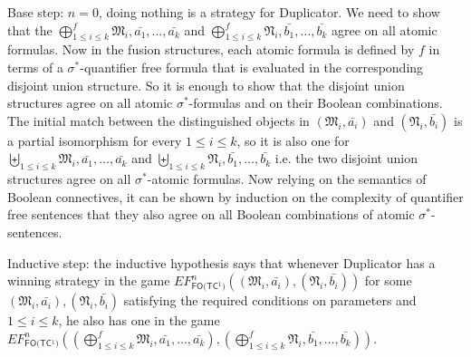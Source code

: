 \documentclass{LMCS}
\newcommand{\frM}{\mathfrak{M}}
\newcommand{\frN}{\mathfrak{N}}
\newcommand{\fotc}{\textsf{FO(TC$^1$)}\xspace}
\begin{document}
Base step: $n=0$, doing nothing is a strategy for Duplicator. We
need to show that the $\bigoplus_{ 1 \leq i \leq k}^f
\frM_i, \bar{a_1},\ldots,\bar{a_k}$ and $\bigoplus_{ 1
\leq i \leq k}^f \frN_i, \bar{b_1},\ldots,\bar{b_k}$ agree on all
atomic formulas. Now in the fusion structures, each atomic formula is
defined by $f$ in terms of a $\sigma^*$-quantifier free formula
that is evaluated in the corresponding disjoint union structure. So it
is enough to show that the disjoint union structures agree on all
atomic $\sigma^*$-formulas and on their Boolean combinations. The
initial match between the distinguished objects in $(\frM_i,
\bar{a_i})$ and $(\frN_i, \bar{b_i})$ is a partial isomorphism for
every $1\leq i \leq k$, so it is also one for $\biguplus_{1
\leq i \leq k} \frM_i, \bar{a_1},\ldots,\bar{a_k}$ and
$\biguplus_{1\leq i\leq k} \frN_i,
\bar{b_1},\ldots,\bar{b_k}$ i.e. the two disjoint union structures
agree on all $\sigma^*$-atomic formulas. Now relying on the
semantics of Boolean connectives, it can be shown by induction on
the complexity of quantifier free sentences that they also agree
on all Boolean combinations of atomic $\sigma^*$-sentences.

Inductive step: the inductive hypothesis says that whenever Duplicator
has a winning strategy in the game $EF_\fotc^n((\frM_i,\bar{a_i}),(\frN_i,\bar{b_i}))$
for some $(\frM_i,\bar{a_i}),(\frN_i,\bar{b_i})$ satisfying the required
conditions on parameters and $1 \leq i\leq k$, he also has one in
the game $EF_\fotc^n((\bigoplus_{ 1 \leq i \leq k}^f \frM_i,
\bar{a_1},\ldots,\bar{a_k}), (\bigoplus_{ 1 \leq i \leq
k}^f \frN_i,
\bar{b_1},\ldots,\bar{b_k}))$.
\end{document}
